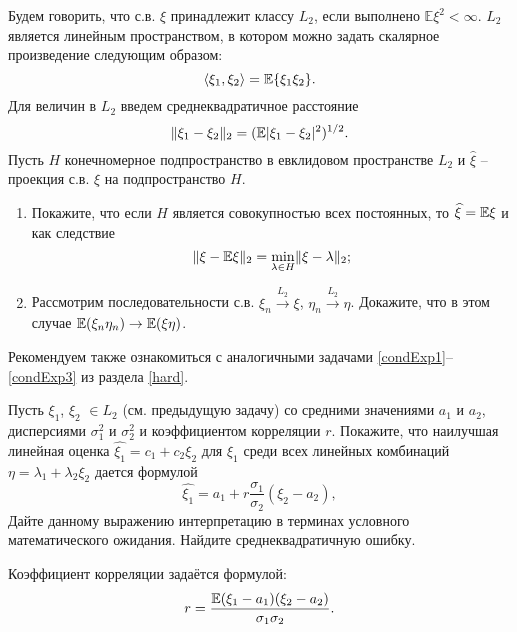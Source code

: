 \begin{problem}
\label{scalar_prod}
Будем говорить, что  с.в. $\xi$ принадлежит классу $L_2$, если  выполнено ${\mathbb E}\xi^2<\infty$. $L_2$ является линейным пространством, в котором можно задать скалярное произведение следующим образом:
\[
\langle \xi_1, \xi_2 \rangle = \mathrm{{\mathbb E}}\{\xi_1 \xi_2\}.
\]
Для величин в $L_2$ введем среднеквадратичное расстояние
\[
\Vert \xi_1 - \xi_2 \Vert_2 = (\mathrm{{\mathbb E}}{|\xi_1 - \xi_2|^2})^{1/2}.
\]
Пусть $H$ конечномерное  подпространство в евклидовом пространстве  $L_2$ и $\widehat{\xi}$ -- проекция с.в. $\xi$ на подпространство $H$.

\begin{enumerate}

\item Покажите, что если $H$ является совокупностью всех постоянных, то 
$\widehat{\xi}  = \mathrm{{\mathbb E}}{\xi}$ и как следствие 
\[
\Vert \xi - \mathrm{{\mathbb E}}{\xi} \Vert_2 = \underset{\lambda \in H}{\min} \Vert \xi - \lambda \Vert_2;
\] 

\item Рассмотрим  последовательности с.в. $\xi_n \overset{L_2}{\longrightarrow} \xi$, $\eta_n \overset{L_2}{\longrightarrow} \eta$. Докажите, что в этом случае  $\mathrm{{\mathbb E}}(\xi_n \eta_n) \rightarrow \mathrm{{\mathbb E}}(\xi \eta)$. 

\end{enumerate}

\end{problem}

\begin{remark}
Рекомендуем также ознакомиться с аналогичными задачами \ref{condExp1}--\ref{condExp3} из раздела \ref{hard}. 
\end{remark}

\begin{problem}
\label{scalar_prod_1}
Пусть  $\xi_1$, $\xi_2$ $\in L_2$ (см. предыдущую задачу) со средними значениями $a_1$ и $a_2$, дисперсиями $\sigma_1^2$ и $\sigma_2^2$ 
и коэффициентом корреляции $r$. Покажите, что наилучшая линейная оценка
$\widehat{\xi_1}  = c_1 + c_2 \xi_2$ для $\xi_1$ среди всех линейных комбинаций $\eta  = \lambda_1 + \lambda_2 \xi_2$  дается формулой 
\[
\widehat{\xi_1}  = a_1 + r \frac{\sigma_1}{\sigma_2} (\xi_2 - a_2),
\]
Дайте данному выражению интерпретацию в терминах условного математического ожидания. Найдите среднеквадратичную ошибку.
\end{problem}
\begin{remark}
Коэффициент корреляции задаётся формулой: 
\[
r = \frac{\mathrm{{\mathbb E}} (\xi_1 - a_1) (\xi_2 - a_2)}{\sigma_1 \sigma_2}.
\]
\end{remark}

